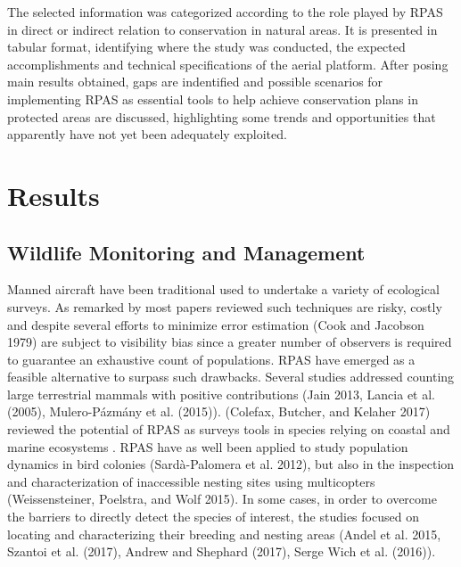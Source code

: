 \documentclass[]{interact}
\theoremstyle{plain}%
\theoremstyle{definition}
\theoremstyle{remark}
\begin{document}
The selected information was categorized according to the role played by
RPAS in direct or indirect relation to conservation in natural areas. It
is presented in tabular format, identifying where the study was
conducted, the expected accomplishments and technical specifications of
the aerial platform. After posing main results obtained, gaps are
indentified and possible scenarios for implementing RPAS as essential
tools to help achieve conservation plans in protected areas are
discussed, highlighting some trends and opportunities that apparently
have not yet been adequately exploited.

\section{Results}\label{results}

\subsection{Wildlife Monitoring and
Management}\label{wildlife-monitoring-and-management}

Manned aircraft have been traditional used to undertake a variety of
ecological surveys. As remarked by most papers reviewed such techniques
are risky, costly and despite several efforts to minimize error
estimation (Cook and Jacobson 1979) are subject to visibility bias since
a greater number of observers is required to guarantee an exhaustive
count of populations. RPAS have emerged as a feasible alternative to
surpass such drawbacks. Several studies addressed counting large
terrestrial mammals with positive contributions (Jain 2013, Lancia et
al. (2005), Mulero-Pázmány et al. (2015)). (Colefax, Butcher, and
Kelaher 2017) reviewed the potential of RPAS as surveys tools in species
relying on coastal and marine ecosystems . RPAS have as well been
applied to study population dynamics in bird colonies (Sardà-Palomera et
al. 2012), but also in the inspection and characterization of
inaccessible nesting sites using multicopters (Weissensteiner, Poelstra,
and Wolf 2015). In some cases, in order to overcome the barriers to
directly detect the species of interest, the studies focused on locating
and characterizing their breeding and nesting areas (Andel et al. 2015,
Szantoi et al. (2017), Andrew and Shephard (2017), Serge Wich et al.
(2016)).
\end{document}
